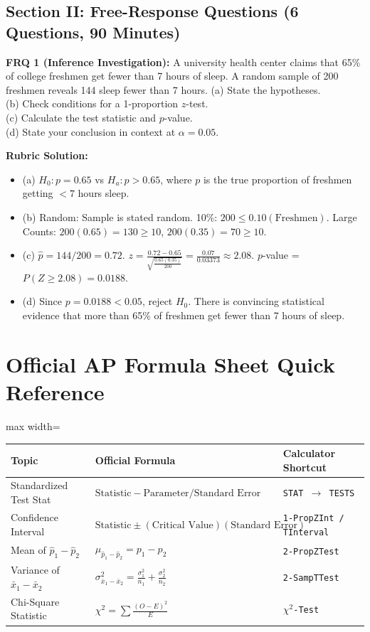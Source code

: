 \documentclass[11pt,oneside,openany]{book}
\begin{document}
\section*{Section II: Free-Response Questions (6 Questions, 90 Minutes)}
\textbf{FRQ 1 (Inference Investigation):} A university health center claims that 65\% of college freshmen get fewer than 7 hours of sleep. A random sample of 200 freshmen reveals 144 sleep fewer than 7 hours.
(a) State the hypotheses.\\
(b) Check conditions for a 1-proportion $z$-test.\\
(c) Calculate the test statistic and $p$-value.\\
(d) State your conclusion in context at $\alpha = 0.05$.

\textbf{Rubric Solution:}
\begin{itemize}[leftmargin=1.2em]
  \item (a) $H_0: p = 0.65$ vs $H_a: p > 0.65$, where $p$ is the true proportion of freshmen getting $<7$ hours sleep.
  \item (b) Random: Sample is stated random. 10\%: $200 \le 0.10(\text{Freshmen})$. Large Counts: $200(0.65) = 130 \ge 10$, $200(0.35) = 70 \ge 10$.
  \item (c) $\hat{p} = 144/200 = 0.72$. $z = \frac{0.72 - 0.65}{\sqrt{\frac{0.65(0.35)}{200}}} = \frac{0.07}{0.03373} \approx 2.08$. $p$-value = $P(Z \ge 2.08) = 0.0188$.
  \item (d) Since $p = 0.0188 < 0.05$, reject $H_0$. There is convincing statistical evidence that more than 65\% of freshmen get fewer than 7 hours of sleep.
\end{itemize}

\backmatter
\chapter*{Official AP Formula Sheet Quick Reference}
\begin{adjustbox}{max width=\linewidth}
\begin{tabular}{lll}
\toprule
\textbf{Topic} & \textbf{Official Formula} & \textbf{Calculator Shortcut} \\
\midrule
Standardized Test Stat & $\text{Statistic} - \text{Parameter} / \text{Standard Error}$ & \texttt{STAT $\rightarrow$ TESTS} \\
Confidence Interval & $\text{Statistic} \pm (\text{Critical Value})(\text{Standard Error})$ & \texttt{1-PropZInt / TInterval} \\
Mean of $\hat{p}_1 - \hat{p}_2$ & $\mu_{\hat{p}_1 - \hat{p}_2} = p_1 - p_2$ & \texttt{2-PropZTest} \\
Variance of $\bar{x}_1 - \bar{x}_2$ & $\sigma^2_{\bar{x}_1 - \bar{x}_2} = \frac{\sigma_1^2}{n_1} + \frac{\sigma_2^2}{n_2}$ & \texttt{2-SampTTest} \\
Chi-Square Statistic & $\chi^2 = \sum \frac{(O-E)^2}{E}$ & \texttt{$\chi^2$-Test} \\
\bottomrule
\end{tabular}
\end{adjustbox}
\end{document}
